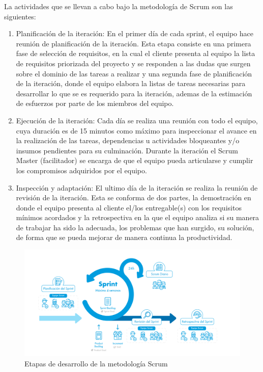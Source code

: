La actividades que se llevan a cabo bajo la metodología de Scrum son las siguientes:

\begin{enumerate}
\item Planificación de la iteración: En el primer día de cada sprint, el equipo hace reunión de planificación de la iteración. Esta etapa consiste en una primera fase de selección de requisitos, en la cual el cliente presenta al equipo la lista de requisitos priorizada del proyecto y se responden a las dudas que surgen sobre el dominio de las tareas a realizar y una segunda fase de planificación de la iteración, donde el equipo elabora la listas de tareas necesarias para desarrollar lo que se es requerido para la iteración, ademas de la estimación de esfuerzos por parte de los miembros del equipo.
\item Ejecución de la iteración: Cada día se realiza una reunión con todo el equipo, cuya duración es de 15 minutos como máximo para inspeccionar el avance en la realización de las tareas, dependencias u actividades bloqueantes y/o insumos pendientes para su culminación. Durante la iteración el Scrum Master (facilitador) se encarga de que el equipo pueda articularse y cumplir los compromisos adquiridos por el equipo.
\item Inspección y adaptación: El ultimo día de la iteración se realiza la reunión de revisión de la iteración. Esta se conforma de dos partes, la demostración en donde el equipo presenta al cliente el/los entregable(s) con los requisitos mínimos acordados y la retrospectiva en la que el equipo analiza si su manera de trabajar ha sido la adecuada, los problemas que han surgido, su solución, de forma que se pueda mejorar de manera continua la productividad.
\end{enumerate}

\begin{figure}[ht]
\centering
\includegraphics[width=1\textwidth]{Figuras/scrum_process.png}
\caption{\label{fig:scrum-process}Etapas de desarrollo de la metodología Scrum}
\end{figure}

